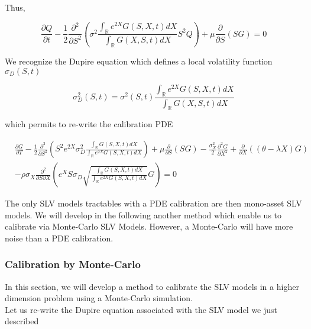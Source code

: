 \documentclass{article}
\begin{document}
\noindent Thus,

\begin{equation}
	\frac{\partial Q}{\partial t} - \frac{1}{2} \frac{\partial^2}{\partial S^2} \left(\sigma^2  \frac{\int_\mathbb{R} e^{2X} G(S,X,t) dX}{\int_\mathbb{R} G(X,S,t) dX}S^2Q\right) + \mu \frac{\partial }{\partial S}(S G) = 0
\end{equation}

\noindent We recognize the Dupire equation which defines a local volatility function $\sigma_D(S,t)$

\begin{equation}
	\sigma_D^2(S,t) = \sigma^2(S,t) \frac{\int_\mathbb{R} e^{2X} G(S,X,t) dX}{\int_\mathbb{R} G(X,S,t) dX}
\end{equation}

\noindent which permits to re-write the calibration PDE

\begin{equation}
\begin{aligned}
\label{eq:SLVCalibrationPDE}
	&\frac{\partial G}{\partial T}
	- \frac{1}{2} \frac{\partial^2}{\partial S^2} \left(S^2 e^{2X} \sigma_D^2 \frac{\int_\mathbb{R} G(S,X,t) dX}{\int_\mathbb{R} e^{2X} G(S,X,t) dX}\right)
+ \mu \frac{\partial}{\partial S}\left( S G\right)
- \frac{\sigma_X^2}{2} \frac{\partial^2 G}{\partial X^2}
+ \frac{\partial }{\partial X} \left((\theta - \lambda X) G\right)\\
&- \rho \sigma_X \frac{\partial^2}{\partial S \partial X} \left(e^X S \sigma_D \sqrt{\frac{\int_\mathbb{R} G(S,X,t) dX}{\int_\mathbb{R} e^{2X} G(S,X,t) dX}} G\right) = 0
\end{aligned}
\end{equation}

The only SLV models tractables with a PDE calibration are then mono-asset SLV models. We will develop in the following another method which enable us to calibrate via Monte-Carlo SLV Models. However, a Monte-Carlo will have more noise than a PDE calibration.

\subsubsection{Calibration by Monte-Carlo}
In this section, we will develop a method to calibrate the SLV models in a higher dimension problem using a Monte-Carlo simulation.\\

\noindent Let us re-write the Dupire equation associated with the SLV model we just described
\end{document}
